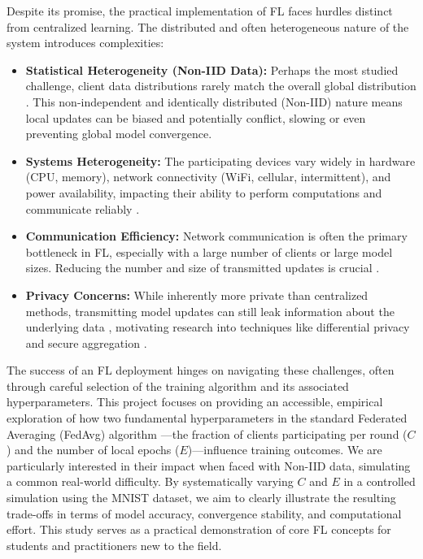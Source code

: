 \documentclass[conference]{IEEEtran}
\begin{document}
Despite its promise, the practical implementation of FL faces hurdles distinct from centralized learning. The distributed and often heterogeneous nature of the system introduces complexities:
\begin{itemize}
    \item \textbf{Statistical Heterogeneity (Non-IID Data):} Perhaps the most studied challenge, client data distributions rarely match the overall global distribution \cite{b3}. This non-independent and identically distributed (Non-IID) nature means local updates can be biased and potentially conflict, slowing or even preventing global model convergence.
    \item \textbf{Systems Heterogeneity:} The participating devices vary widely in hardware (CPU, memory), network connectivity (WiFi, cellular, intermittent), and power availability, impacting their ability to perform computations and communicate reliably \cite{b19}.
    \item \textbf{Communication Efficiency:} Network communication is often the primary bottleneck in FL, especially with a large number of clients or large model sizes. Reducing the number and size of transmitted updates is crucial \cite{b5}.
    \item \textbf{Privacy Concerns:} While inherently more private than centralized methods, transmitting model updates can still leak information about the underlying data \cite{b12}, motivating research into techniques like differential privacy and secure aggregation \cite{b13, b14}.
\end{itemize}

The success of an FL deployment hinges on navigating these challenges, often through careful selection of the training algorithm and its associated hyperparameters. This project focuses on providing an accessible, empirical exploration of how two fundamental hyperparameters in the standard Federated Averaging (FedAvg) algorithm \cite{b2}—the fraction of clients participating per round ($C$) and the number of local epochs ($E$)—influence training outcomes. We are particularly interested in their impact when faced with Non-IID data, simulating a common real-world difficulty. By systematically varying $C$ and $E$ in a controlled simulation using the MNIST dataset, we aim to clearly illustrate the resulting trade-offs in terms of model accuracy, convergence stability, and computational effort. This study serves as a practical demonstration of core FL concepts for students and practitioners new to the field.
\end{document}
